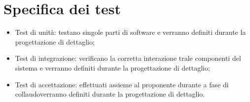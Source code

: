 \section{Specifica dei test}
\begin{itemize}
    \item Test di unità: testano singole parti di software e verranno definiti durante la progettazione di dettaglio;
    \item Test di integrazione: verificano la corretta interazione trale componenti del sistema e verranno definiti durante la progettazione di dettaglio;
    \item Test di accettazione: effettuati assieme al proponente durante a fase di collaudoverranno definiti durante la progettazione di dettaglio.
\end{itemize}